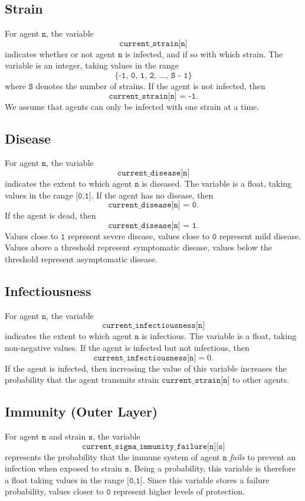\documentclass[10pt,letterpaper]{article}
\begin{document}
\subsection{Strain}

For agent $\texttt{n}$, the variable $$\texttt{current{\_}strain[n]}$$ indicates whether or not agent $\texttt{n}$ is infected, and if so with which strain. The variable is an integer, taking values in the range $$\{\texttt{-1, 0, 1, 2, \ldots, S - 1}\}$$ where $\texttt{S}$ denotes the number of strains. If the agent is not infected, then $$\texttt{current{\_}strain[n] = -1}.$$ We assume that agents can only be infected with one strain at a time.

\subsection{Disease}

For agent $\texttt{n}$, the variable $$\texttt{current{\_}disease[n]}$$ indicates the extent to which agent $\texttt{n}$ is diseased. The variable is a float, taking values in the range $\texttt{[0,1]}.$ If the agent has no disease, then $$\texttt{current{\_}disease[n] = 0}.$$ If the agent is dead, then $$\texttt{current{\_}disease[n] = 1}.$$ Values close to $\texttt{1}$ represent severe disease, values close to $\texttt{0}$ represent mild disease. Values above a threshold represent symptomatic disease, values below the threshold represent asymptomatic disease. 

\subsection{Infectiousness}

For agent $\texttt{n}$, the variable $$\texttt{current{\_}infectiousness[n]}$$ indicates the extent to which agent $\texttt{n}$ is infectious. The variable is a float, taking non-negative values. If the agent is infected but not infectious, then $$\texttt{current{\_}infectiousness[n]} = 0.$$ If the agent is infected, then increasing the value of this variable increases the probability that the agent transmits strain $\texttt{current{\_}strain[n]}$ to other agents.

\subsection{Immunity (Outer Layer)}

For agent $\texttt{n}$ and strain $\texttt{s}$, the variable $$\texttt{current{\_}sigma{\_}immunity{\_}failure[n][s]}$$ represents the probability that the immune system of agent $\texttt{n}$ \textit{fails} to prevent an infection when exposed to strain $\texttt{s}$. Being a probability, this variable is therefore a float taking values in the range $\texttt{[0,1]}.$ Since this variable stores a failure probability, values closer to $\texttt{0}$ represent higher levels of protection.
\end{document}
